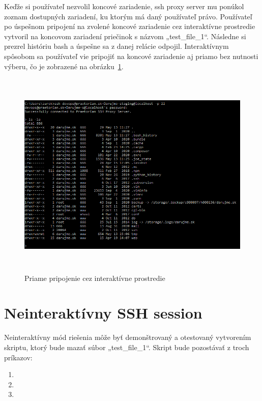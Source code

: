 Keďže si používateľ nezvolil koncové zariadenie, ssh proxy server mu ponúkol zoznam dostupných zariadení, ku ktorým má daný používateľ
právo. Používateľ po úspešnom pripojení na zvolené koncové zariadenie cez interaktívne prostredie vytvoril na koncovom zariadení
priečinok s názvom „test\_file\_1“. Následne si prezrel históriu bash a úspešne sa z danej relácie odpojil.
Interaktívnym spôsobom sa používateľ vie pripojiť na koncové zariadenie aj priamo bez nutnosti výberu, čo je zobrazené na
obrázku~\ref{fig:obr_17}.

\begin{figure}[H]
\begin{center}\includegraphics[width=\textwidth,height=10cm,keepaspectratio=true]{assets/direct_interactive_session.png}\end{center}
\caption[Priame pripojenie cez interaktívne prostredie]{Priame pripojenie cez interaktívne prostredie}\label{fig:obr_17}
\end{figure}

\section{Neinteraktívny SSH session}\label{sec:neinteraktivny-ssh-session}

Neinteraktívny mód riešenia môže byť demonštrovaný a otestovaný vytvorením skriptu, ktorý bude mazať súbor „test\_file\_1“.
Skript bude pozostávať z troch príkazov:

\begin{enumerate}
  \item {}
  \item {}
  \item {}
\end{enumerate}

